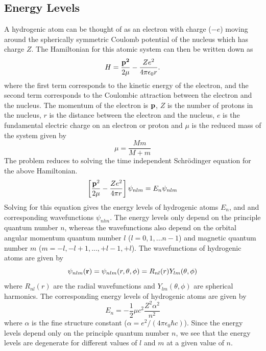 \documentclass[a4paper]{IEEEtran}
\begin{document}
    \subsection{Energy Levels}
    A hydrogenic atom can be thought of as an electron with charge ($-e$) moving around
    the spherically symmetric Coulomb potential of the nucleus which has charge $Z$.
    The Hamiltonian for this atomic system can then be written down as
    \begin{equation} 
        H = \frac{\bf{p}^2}{2\mu} - \frac{Ze^2}{4 \pi \epsilon_0 r}.
    \end{equation} 
    where the first term corresponds to the kinetic energy of the electron, and
    the second term corresponds to the Coulombic attraction between the electron and 
    the nucleus. The momentum of the electron is $\bf{p}$, $Z$ is the number of protons
    in the nucleus, $r$ is the distance between the electron and the nucleus, $e$ is
    the fundamental electric charge on an electron or proton and $\mu$ is
    the reduced mass of the system given by
    \begin{equation}
        \mu = \frac{Mm}{M + m}
    \end{equation}
    The problem reduces to solving the time independent Schr\"odinger equation
    for the above Hamiltonian.
    \begin{equation}
    \left[ \frac{{\bf p}^2}{2\mu} - \frac{Ze^2}{4 \pi r}\right] \psi_{nlm} = E_n \psi_{nlm} 
    \end{equation}
    Solving for this equation gives the energy levels of hydrogenic atoms $E_n$, and 
    and corresponding wavefunctions $\psi_{nlm}$. The energy levels only depend on the
    principle quantum number $n$, whereas the wavefunctions also depend on the 
    orbital angular momentum quantum number $l$ ($l = 0, 1, ... n - 1$) and 
    magnetic quantum number $m$ ($m = -l, -l + 1, ... , +l - 1, +l$).
    The wavefunctions of hydrogenic atoms are given by
    \begin{equation}
        \psi_{nlm}({\bf r}) = \psi_{nlm}(r,\theta,\phi)
                           = R_{nl}(r) Y_{lm}(\theta, \phi)
    \end{equation}
    where $R_{nl}(r)$ are the radial wavefunctions and $Y_{lm}(\theta, \phi)$ are
    spherical harmonics. The corresponding energy levels of hydrogenic atoms are
    given by
    \begin{equation}
        E_n = - \frac{1}{2} \mu c^2 \frac{Z^2 \alpha^2}{n^2}
    \end{equation}
    where $\alpha$ is the fine structure constant 
    ($ \alpha = e^2 / (4 \pi \epsilon_0 \hbar c) $).
    Since the energy levels depend only on the principle quantum number $n$, we see
    that the energy levels are degenerate for different values of $l$ and $m$ at a 
    given value of $n$.
    
\end{document}
